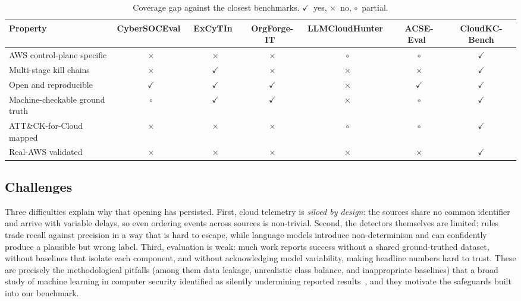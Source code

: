 \documentclass[journal]{IEEEtran}
\newcommand{\cmark}{\ensuremath{\checkmark}}
\newcommand{\xmark}{\ensuremath{\times}}
\begin{document}
\begin{table}[t]
\caption{Coverage gap against the closest benchmarks. \cmark~yes, \xmark~no, $\circ$~partial.}
\label{tab:coverage}
\centering
\begin{tabular}{lcccccc}
\toprule
Property & CyberSOCEval~\cite{cybersoceval} & ExCyTIn~\cite{excytin} & OrgForge-IT~\cite{orgforge} & LLMCloudHunter~\cite{llmcloudhunter} & ACSE-Eval~\cite{acseeval} & \textbf{CloudKC-Bench} \\
\midrule
AWS control-plane specific     & \xmark & \xmark & \xmark & $\circ$ & $\circ$ & \cmark \\
Multi-stage kill chains        & \xmark & \cmark & \xmark & \xmark  & \xmark  & \cmark \\
Open and reproducible          & \cmark & \cmark & \cmark & \xmark  & \cmark  & \cmark \\
Machine-checkable ground truth & $\circ$ & \cmark & \cmark & \xmark & $\circ$ & \cmark \\
ATT\&CK-for-Cloud mapped       & \xmark & \xmark & \xmark & $\circ$ & $\circ$ & \cmark \\
Real-AWS validated             & \xmark & \xmark & \xmark & \xmark  & \xmark  & \cmark \\
\bottomrule
\end{tabular}
\end{table}

\subsection{Challenges}
Three difficulties explain why that opening has persisted. First, cloud telemetry is \emph{siloed by
design}: the sources share no common identifier and arrive with variable delays, so even ordering
events across sources is non-trivial. Second, the detectors themselves are limited: rules trade recall
against precision in a way that is hard to escape, while language models introduce non-determinism and
can confidently produce a plausible but wrong label. Third, evaluation is weak: much work reports
success without a shared ground-truthed dataset, without baselines that isolate each component, and
without acknowledging model variability, making headline numbers hard to trust. These are precisely the
methodological pitfalls (among them data leakage, unrealistic class balance, and inappropriate
baselines) that a broad study of machine learning in computer security identified as silently
undermining reported results~\cite{arp22}, and they motivate the safeguards built into our benchmark.
\end{document}
